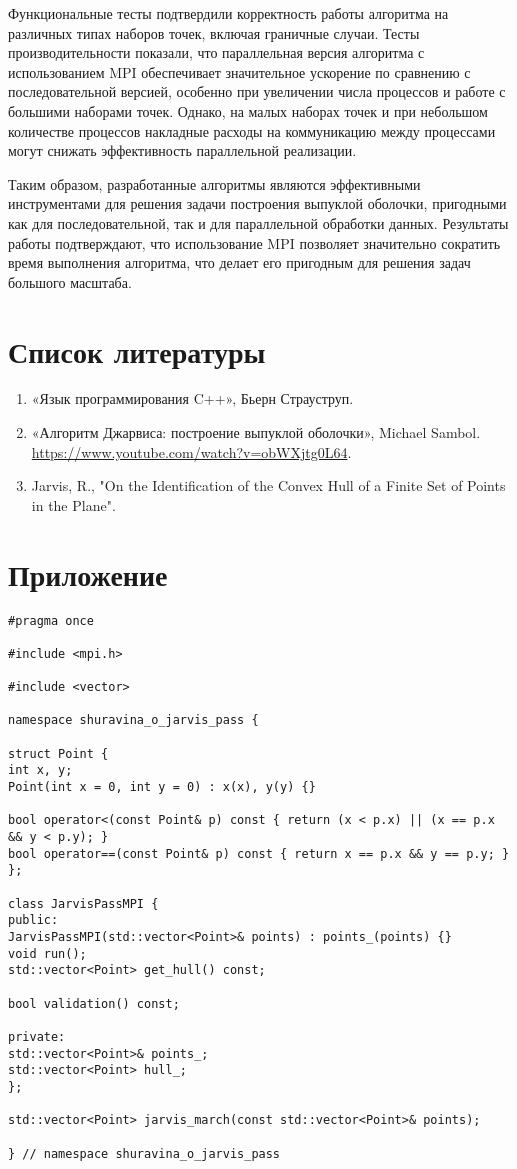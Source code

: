 \documentclass[12pt]{article}
\begin{document}
Функциональные тесты подтвердили корректность работы алгоритма на различных типах наборов точек, включая граничные случаи. Тесты производительности показали, что параллельная версия алгоритма с использованием MPI обеспечивает значительное ускорение по сравнению с последовательной версией, особенно при увеличении числа процессов и работе с большими наборами точек. Однако, на малых наборах точек и при небольшом количестве процессов накладные расходы на коммуникацию между процессами могут снижать эффективность параллельной реализации.

Таким образом, разработанные алгоритмы являются эффективными инструментами для решения задачи построения выпуклой оболочки, пригодными как для последовательной, так и для параллельной обработки данных. Результаты работы подтверждают, что использование MPI позволяет значительно сократить время выполнения алгоритма, что делает его пригодным для решения задач большого масштаба.

\newpage
\section*{Список литературы}

\begin{enumerate}
\item «Язык программирования C++», Бьерн Страуструп.
\item «Алгоритм Джарвиса: построение выпуклой оболочки», Michael Sambol.
\url {https://www.youtube.com/watch?v=obWXjtg0L64}.
\item Jarvis, R., "On the Identification of the Convex Hull of a Finite Set of Points in the Plane".
\end{enumerate}

\newpage
\section*{Приложение}

\begin{lstlisting}[caption={ops\_mpi\_.hpp}]
#pragma once

#include <mpi.h>

#include <vector>

namespace shuravina_o_jarvis_pass {

struct Point {
int x, y;
Point(int x = 0, int y = 0) : x(x), y(y) {}

bool operator<(const Point& p) const { return (x < p.x) || (x == p.x && y < p.y); }
bool operator==(const Point& p) const { return x == p.x && y == p.y; }
};

class JarvisPassMPI {
public:
JarvisPassMPI(std::vector<Point>& points) : points_(points) {}
void run();
std::vector<Point> get_hull() const;

bool validation() const;

private:
std::vector<Point>& points_;
std::vector<Point> hull_;
};

std::vector<Point> jarvis_march(const std::vector<Point>& points);

} // namespace shuravina_o_jarvis_pass
\end{lstlisting}
\end{document}
